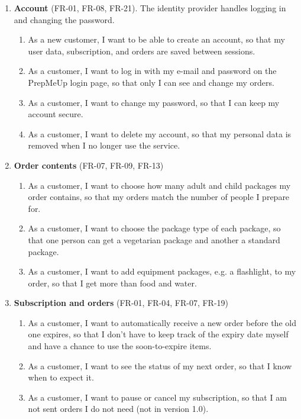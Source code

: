\documentclass[a4paper,11pt]{article}
\begin{document}
\begin{enumerate}
    \item \textbf{Account} (FR-01, FR-08, FR-21). The identity provider handles logging in and changing the password.
    \begin{enumerate}
        \item As a new customer, I want to be able to create an account, so that my user data, subscription, and orders are saved between sessions.
        \item As a customer, I want to log in with my e-mail and password on the PrepMeUp login page, so that only I can see and change my orders.
        \item As a customer, I want to change my password, so that I can keep my account secure.
        \item As a customer, I want to delete my account, so that my personal data is removed when I no longer use the service.
    \end{enumerate}

    \item \textbf{Order contents} (FR-07, FR-09, FR-13)
    \begin{enumerate}
        \item As a customer, I want to choose how many adult and child packages my order contains, so that my orders match the number of people I prepare for.
        \item As a customer, I want to choose the package type of each package, so that one person can get a vegetarian package and another a standard package.
        \item As a customer, I want to add equipment packages, e.g. a flashlight, to my order, so that I get more than food and water.
    \end{enumerate}

    \item \textbf{Subscription and orders} (FR-01, FR-04, FR-07, FR-19)
    \begin{enumerate}
        \item As a customer, I want to automatically receive a new order before the old one expires, so that I don't have to keep track of the expiry date myself and have a chance to use the soon-to-expire items.
        \item As a customer, I want to see the status of my next order, so that I know when to expect it.
        \item As a customer, I want to pause or cancel my subscription, so that I am not sent orders I do not need (not in version 1.0).
    \end{enumerate}


\end{enumerate}
\end{document}
